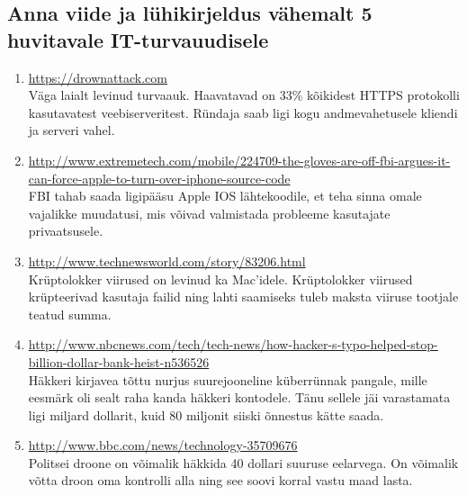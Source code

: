 \documentclass{article}
\begin{document}
\begin{enumerate}
\section{Anna viide ja lühikirjeldus vähemalt 5 huvitavale IT-turvauudisele}
\begin{enumerate}
	\item{\url{https://drownattack.com}\\
		Väga laialt levinud turvaauk. Haavatavad on 33\% kõikidest HTTPS protokolli kasutavatest veebiserveritest. 
		Ründaja saab ligi kogu andmevahetusele kliendi ja serveri vahel.}
	\item{\url{http://www.extremetech.com/mobile/224709-the-gloves-are-off-fbi-argues-it-can-force-apple-to-turn-over-iphone-source-code}\\
		FBI tahab saada ligipääsu Apple IOS lähtekoodile, et teha sinna omale vajalikke muudatusi, mis võivad valmistada probleeme kasutajate privaatsusele.}
	\item{\url{http://www.technewsworld.com/story/83206.html}\\
		Krüptolokker viirused on levinud ka Mac'idele. Krüptolokker viirused krüpteerivad kasutaja failid ning lahti saamiseks tuleb maksta viiruse tootjale teatud summa.}
	\item{\url{http://www.nbcnews.com/tech/tech-news/how-hacker-s-typo-helped-stop-billion-dollar-bank-heist-n536526}\\
		Häkkeri kirjavea tõttu nurjus suurejooneline küberrünnak pangale, mille eesmärk oli sealt raha kanda häkkeri kontodele. Tänu sellele jäi varastamata ligi miljard dollarit, kuid 80 miljonit siiski õnnestus kätte saada.}
	\item{\url{http://www.bbc.com/news/technology-35709676}\\
		Politsei droone on võimalik häkkida 40 dollari suuruse eelarvega. On võimalik võtta droon oma kontrolli alla ning see soovi korral vastu maad lasta.}
\end{enumerate}


\end{enumerate}
\end{document}
